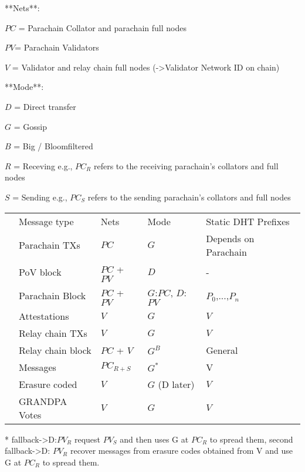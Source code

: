 **Nets**:

$PC$ = Parachain Collator and parachain full nodes

$PV$= Parachain Validators

$V$ = Validator and relay chain full nodes (->Validator Network ID on chain)

**Mode**:

$D$ = Direct transfer

$G$ = Gossip

$B$ = Big / Bloomfiltered

$R$ = Receving e.g., $PC_{R}$ refers to the receiving parachain's collators and full nodes

$S$ = Sending e.g., $PC_{S}$ refers to the sending parachain's collators and full nodes

\begin{table}[]
\begin{tabular}{lllll}
& Message type  & Nets  & Mode  & Static DHT Prefixes \\
& Parachain TXs  & $PC$   & $G$   &Depends on Parachain\\
& PoV block  & $PC$ + $PV$  & $D$         & - \\
& Parachain Block & $PC$ + $PV$   & $G$:$PC$, $D$:$PV$ &$P_0$,...,$P_n$\\
& Attestations   & $V$   & $G$  & $V$ \\
& Relay chain TXs & $V$    & $G$   & $V$ \\
& Relay chain block & $PC$ + $V$  & $G^B$   & General \\
& Messages  & $PC_{R + S}$ & $G^*$     & V \\
& Erasure coded    & $V$           & $G$ (D later)        &$V$\\
& GRANDPA Votes   &$V$          & $G$      &$V$\\
\end{tabular}
\end{table}

* fallback->D:$PV_{R}$ request $PV_{S}$ and then uses G at $PC_{R}$ to spread them,
second fallback->D: $PV_{R}$ recover messages from erasure codes obtained from V and use G at $PC_{R}$ to spread them.
